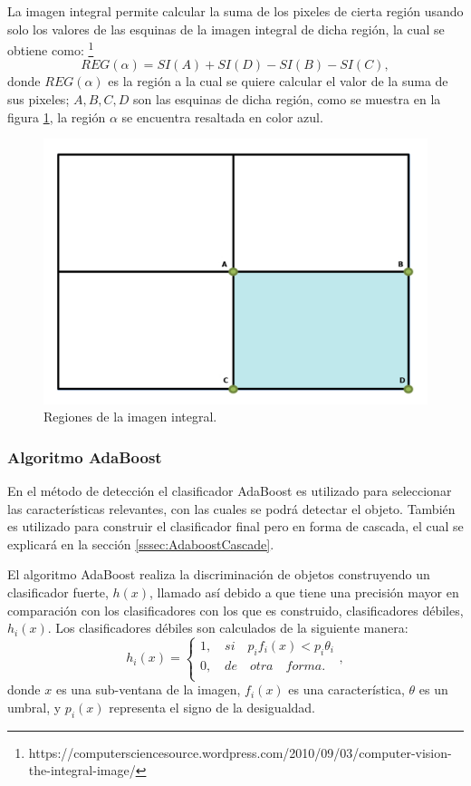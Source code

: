 La imagen integral permite calcular la suma de los pixeles de cierta región usando solo los valores de las esquinas de la imagen integral de dicha región, la cual se obtiene como: \footnote{https://computersciencesource.wordpress.com/2010/09/03/computer-vision-the-integral-image/}   
$$REG(\alpha)=SI(A)+SI(D)-SI(B)-SI(C),$$
donde $REG(\alpha)$ es la región a la cual se quiere calcular el valor de la suma de sus pixeles; $A,B,C,D$ son las esquinas de dicha región, como se muestra en la figura \ref{fig:figImageIntegral}, la región $\alpha$ se encuentra resaltada en color azul.  
\begin{figure}[h!]
\begin{center}
\includegraphics[scale=.25]{./Figures/IntegralImage.png}
\end{center}
\caption{Regiones de la imagen integral.}
\label{fig:figImageIntegral}
\end{figure} 


\subsubsection{Algoritmo AdaBoost}\label{sssec:AdaboostClasifier}  

En el método de detección el clasificador AdaBoost es utilizado para seleccionar las características relevantes, con las cuales se podrá detectar el objeto. También es utilizado para construir el clasificador final pero en forma de cascada, el cual se explicará en la sección \ref{sssec:AdaboostCascade}. 

El algoritmo AdaBoost realiza la discriminación de objetos construyendo un clasificador fuerte, $h(x)$, llamado así debido a que tiene una precisión mayor en comparación con los clasificadores con los que es construido, clasificadores débiles, $h_i(x)$. Los clasificadores débiles son calculados de la siguiente manera: 
$$h_i(x)=
\begin{cases}   
1, \quad si \quad  p_if_i(x)<p_i \theta_i \\
0, \quad de \quad otra \quad forma.\\
\end{cases} ,$$
donde $x$ es una sub-ventana de la imagen, $f_i(x)$ es una característica, $\theta$ es un umbral, y $p_i(x)$ representa el signo de la desigualdad.   

